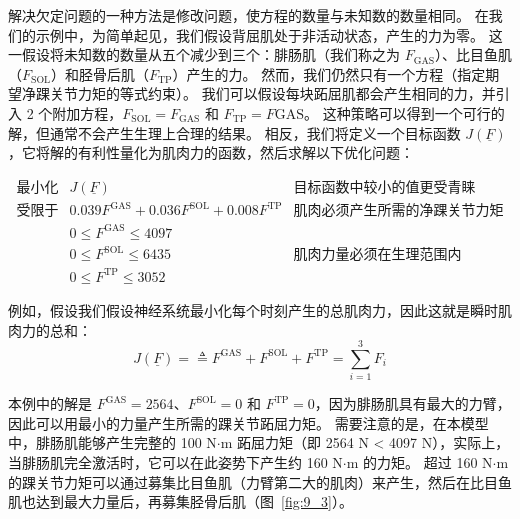 解决欠定问题的一种方法是修改问题，使方程的数量与未知数的数量相同。
在我们的示例中，为简单起见，我们假设背屈肌处于非活动状态，产生的力为零。
这一假设将未知数的数量从五个减少到三个：腓肠肌（我们称之为 $ F_\text{GAS} $）、比目鱼肌（$ F_\text{SOL} $）和胫骨后肌（$ F_\text{TP} $）产生的力。
然而，我们仍然只有一个方程（指定期望净踝关节力矩的等式约束）。
我们可以假设每块跖屈肌都会产生相同的力，并引入 2 个附加方程，$ F_\text{SOL} = F_\text{GAS} $ 和 $ F_\text{TP} = F\text{GAS} $。
这种策略可以得到一个可行的解，但通常不会产生生理上合理的结果。
相反，我们将定义一个目标函数 $ J(\underline{F}) $，它将解的有利性量化为肌肉力的函数，然后求解以下优化问题：
%
\begin{proposition}

\begin{equation}
	\begin{aligned}
		\text{最小化} & J(\underline{F})  &  \text{目标函数中较小的值更受青睐} \\
		\text{受限于} & 0.039 F^\text{GAS} + 0.036 F^\text{SOL} + 0.008 F^\text{TP} & \text{肌肉必须产生所需的净踝关节力矩} \\
		& 0 \leq F^\text{GAS} \leq 4097 & \\
		& 0 \leq F^\text{SOL} \leq 6435 & \text{肌肉力量必须在生理范围内} \\
		& 0 \leq F^\text{TP} \leq 3052 &  \nonumber
	\end{aligned}
\end{equation}

\end{proposition}


例如，假设我们假设神经系统最小化每个时刻产生的总肌肉力，因此这就是瞬时肌肉力的总和：
%
\begin{equation}
	J ( \underline{F} ) = 
		\triangleq
		F ^\text{GAS} + 
		F ^\text{SOL} + 
		F ^\text{TP} 
		= \sum_{i=1}^{3} F_i
	\label{eq:9_1}
\end{equation}

本例中的解是 $F^\text{GAS} = 2564$、$F^\text{SOL} = 0$ 和 $F^\text{TP} = 0$，因为腓肠肌具有最大的力臂，因此可以用最小的力量产生所需的踝关节跖屈力矩。
需要注意的是，在本模型中，腓肠肌能够产生完整的 100 N$\cdot$m 跖屈力矩（即 2564 N < 4097 N），实际上，当腓肠肌完全激活时，它可以在此姿势下产生约 160 N$\cdot$m 的力矩。
超过 160 N$\cdot$m 的踝关节力矩可以通过募集比目鱼肌（力臂第二大的肌肉）来产生，然后在比目鱼肌也达到最大力量后，再募集胫骨后肌（图~\ref{fig:9_3}）。

